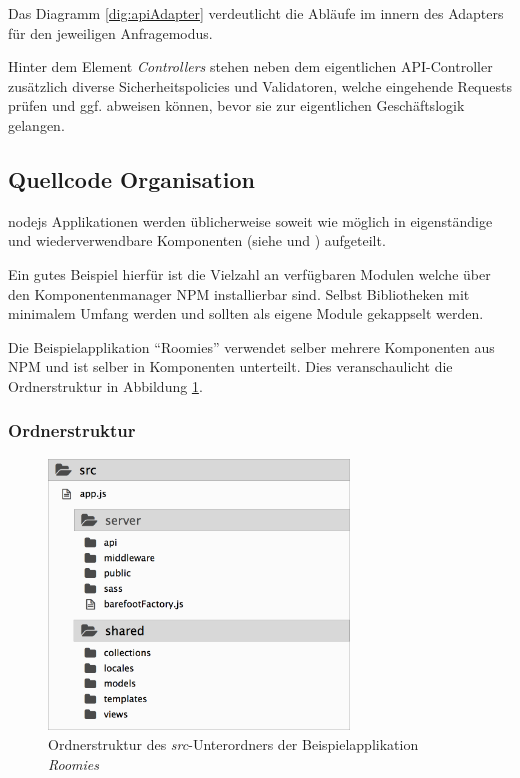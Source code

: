 Das Diagramm \ref{dig:apiAdapter} verdeutlicht die Abläufe im innern des Adapters für den jeweiligen Anfragemodus.

Hinter dem Element \emph{Controllers} stehen neben dem eigentlichen API-Controller zusätzlich diverse Sicherheitspolicies und Validatoren, welche eingehende Requests prüfen und ggf. abweisen können, bevor sie zur eigentlichen Geschäftslogik gelangen.




\subsection{Quellcode Organisation}
\gls{nodejs} Applikationen werden üblicherweise soweit wie möglich in eigenständige und wiederverwendbare Komponenten (siehe \cite{TJH_ComponentStructure} und \cite{IZS_ComponentStructure}) aufgeteilt.

Ein gutes Beispiel hierfür ist die Vielzahl an verfügbaren Modulen welche über den Komponentenmanager NPM \cite{NPM} installierbar sind. Selbst Bibliotheken mit minimalem Umfang werden und sollten als eigene Module gekappselt werden.

Die Beispielapplikation ``Roomies'' verwendet selber mehrere Komponenten aus NPM \cite{NPM} und ist selber in Komponenten unterteilt. Dies veranschaulicht die Ordnerstruktur in Abbildung \ref{fig:roomiesFolderStructure}.

\newpage
\subsubsection*{Ordnerstruktur}

\begin{figure}[H]
	\centering
	\includegraphics[width=8cm]{content/sad/images/folder-structure.png}
	\caption{Ordnerstruktur des \emph{src}-Unterordners der Beispielapplikation \emph{Roomies}}
	\label{fig:roomiesFolderStructure}
\end{figure}

